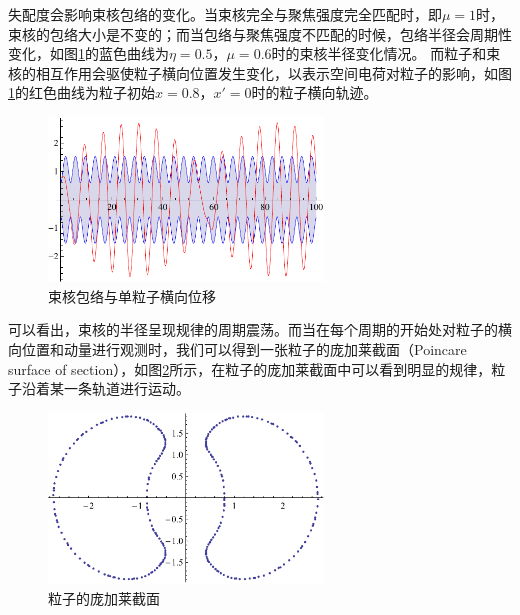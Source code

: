 失配度会影响束核包络的变化。当束核完全与聚焦强度完全匹配时，即$\mu = 1$时，束核的包络大小是不变的；而当包络与聚焦强度不匹配的时候，包络半径会周期性变化，如图\ref{fig:particle_core_envelope}的蓝色曲线为$\eta = 0.5$，$\mu = 0.6$时的束核半径变化情况。
而粒子和束核的相互作用会驱使粒子横向位置发生变化，以表示空间电荷对粒子的影响，如图\ref{fig:particle_core_envelope}的红色曲线为粒子初始$x=0.8$，$x'=0$时的粒子横向轨迹。

\begin{figure}[!tbh]
    \centering
    \includegraphics[width=0.65\textwidth]{Img/particle_core_envelope.pdf}
    \caption{束核包络与单粒子横向位移}
    \label{fig:particle_core_envelope}
\end{figure}

可以看出，束核的半径呈现规律的周期震荡。而当在每个周期的开始处对粒子的横向位置和动量进行观测时，我们可以得到一张粒子的庞加莱截面（Poincare surface of section），如图\ref{fig:particle_core_particle}所示，在粒子的庞加莱截面中可以看到明显的规律，粒子沿着某一条轨道进行运动。
\begin{figure}[!tbh]
    \centering
    \includegraphics[width=0.65\textwidth]{Img/particle_core_particle.pdf}
    \caption{粒子的庞加莱截面}
    \label{fig:particle_core_particle}
\end{figure}

